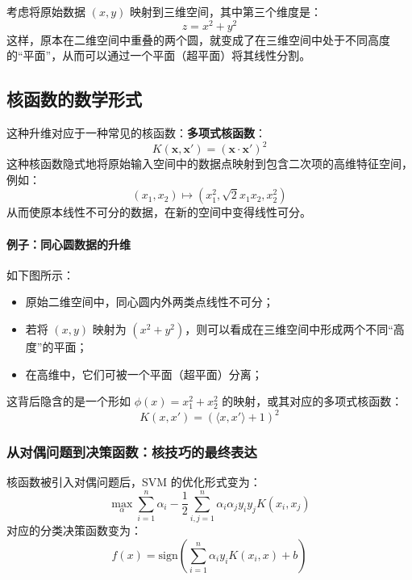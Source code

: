 考虑将原始数据 \((x, y)\) 映射到三维空间，其中第三个维度是：
\[
z = x^2 + y^2
\]
这样，原本在二维空间中重叠的两个圆，就变成了在三维空间中处于不同高度的“平面”，从而可以通过一个平面（超平面）将其线性分割。
\subsection{核函数的数学形式}


这种升维对应于一种常见的核函数：\textbf{多项式核函数}：
\[
K(\mathbf{x}, \mathbf{x}') = (\mathbf{x} \cdot \mathbf{x}')^2
\]
这种核函数隐式地将原始输入空间中的数据点映射到包含二次项的高维特征空间，例如：
\[
(x_1, x_2) \mapsto (x_1^2, \sqrt{2}x_1 x_2, x_2^2)
\]
从而使原本线性不可分的数据，在新的空间中变得线性可分。

\paragraph{例子：同心圆数据的升维}
如下图所示：
\begin{itemize}
    \item 原始二维空间中，同心圆内外两类点线性不可分；
    \item 若将 $(x, y)$ 映射为 $(x^2 + y^2)$，则可以看成在三维空间中形成两个不同“高度”的平面；
    \item 在高维中，它们可被一个平面（超平面）分离；
\end{itemize}
这背后隐含的是一个形如 $\phi(x) = x_1^2 + x_2^2$ 的映射，或其对应的多项式核函数：\[
K(x, x') = (\langle x, x' \rangle + 1)^2
\]
\subsubsection{从对偶问题到决策函数：核技巧的最终表达}


核函数被引入对偶问题后，SVM 的优化形式变为：
\begin{equation}
\max_\alpha \sum_{i=1}^n \alpha_i - \frac{1}{2} \sum_{i,j=1}^n \alpha_i \alpha_j y_i y_j K(x_i, x_j)
\end{equation}
对应的分类决策函数变为：\begin{equation}
\boxed{
    f(x) = \mathrm{sign}\left(\sum_{i=1}^n \alpha_i y_i K(x_i, x) + b\right)
}
\end{equation}
